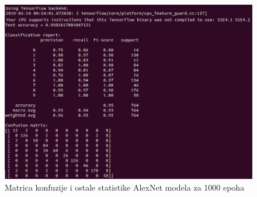\documentclass[a4paper]{article}
\begin{document}
\begin{figure}[h!]
\begin{center}
\includegraphics[scale=0.65]{confussion_matrix_alexNet_1000epoh.png}
\end{center}
\caption{Matrica konfuzije i ostale statistike AlexNet modela za 1000 epoha}
\label{fig:alex_net_matrix}
\end{figure}

\newpage
\end{document}
